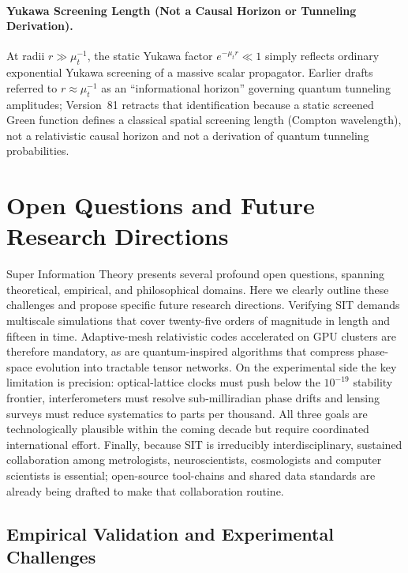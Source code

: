 \documentclass[american,11pt,letterpaper]{article}
\def\emph#1{#1}%
\begin{document}
\paragraph{Yukawa Screening Length (Not a Causal Horizon or Tunneling Derivation).}
At radii $r \gg \mu_t^{-1}$, the static Yukawa factor $e^{-\mu_t r} \ll 1$ simply reflects ordinary exponential Yukawa screening of a massive scalar propagator. Earlier drafts referred to $r \approx \mu_t^{-1}$ as an ``informational horizon'' governing quantum tunneling amplitudes; Version~81 retracts that identification because a static screened Green function defines a classical spatial screening length (Compton wavelength), \emph{not} a relativistic causal horizon and \emph{not} a derivation of quantum tunneling probabilities.

\section{Open Questions and Future Research Directions}
\label{sec:open-questions-future-directions}

Super Information Theory presents several profound open questions, spanning theoretical, empirical, and philosophical domains. Here we clearly outline these challenges and propose specific future research directions. Verifying SIT demands multiscale simulations that cover twenty-five orders of magnitude in length and fifteen in time.  Adaptive-mesh relativistic codes accelerated on GPU clusters are therefore mandatory, as are quantum-inspired algorithms that compress phase-space evolution into tractable tensor networks.  On the experimental side the key limitation is precision: optical-lattice clocks must push below the $10^{-19}$ stability frontier, interferometers must resolve sub-milliradian phase drifts and lensing surveys must reduce systematics to parts per thousand.  All three goals are technologically plausible within the coming decade but require coordinated international effort.  Finally, because SIT is irreducibly interdisciplinary, sustained collaboration among metrologists, neuroscientists, cosmologists and computer scientists is essential; open-source tool-chains and shared data standards are already being drafted to make that collaboration routine.

\subsection{Empirical Validation and Experimental Challenges}
\end{document}
